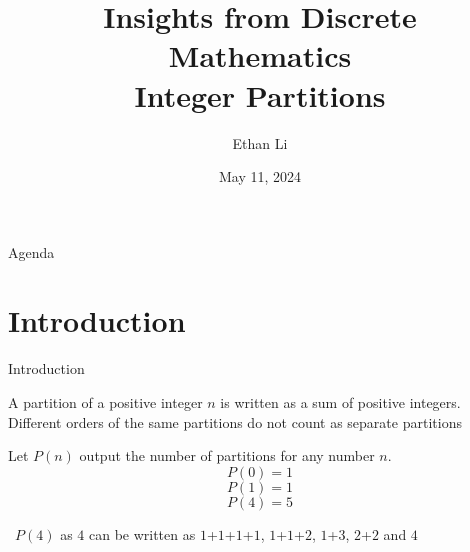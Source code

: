 \documentclass{beamer}
\title{Insights from Discrete Mathematics \\ Integer Partitions}
\author{Ethan Li}
\date{May 11, 2024}
\begin{document}
    \begin{frame}
        \titlepage
    \end{frame}


    \begin{frame}{Agenda}
        \tableofcontents
    \end{frame}


    \section{Introduction}
    \begin{frame}{Introduction}
        \begin{definition}
            A partition of a positive integer $n$ is written as a sum of positive integers. Different orders of the same partitions do not count as separate partitions
        \end{definition}

        \begin{example}
            Let $P(n)$ output the number of partitions for any number $n$.
            \begin{equation}
                P(0) = 1
            \end{equation}
            \begin{equation}
                P(1) = 1
            \end{equation}
            \begin{equation}
                P(4) = 5
            \end{equation}
            
            \scriptsize\centering\ $P(4)$ as $4$ can be written as $1$+$1$+$1$+$1$, $1$+$1$+$2$, $1$+$3$, $2$+$2$ and $4$
        \end{example}
    \end{frame}
\end{document}
